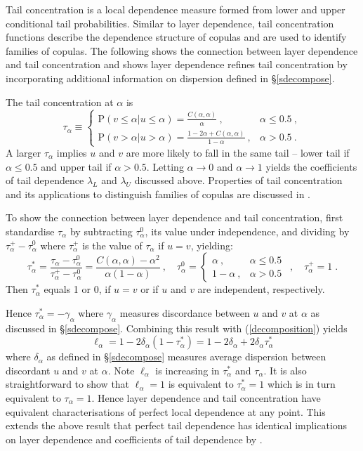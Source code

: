 \documentclass[authoryear]{elsarticle}
\newcommand{\p}{\mathrm{P}}
\newcommand{\cq}{\ ,\quad }
\newcommand{\eref}[1]{(\ref{#1})}
\newcommand{\sref}[1]{\S\ref{#1}}
\begin{document}
Tail concentration \citep{venter2002tails} is a local dependence measure formed from lower and upper conditional tail probabilities. Similar to layer dependence, tail concentration functions describe the dependence structure of copulas and are used to identify families of copulas. The following shows the connection between layer dependence and tail concentration and shows layer dependence refines tail concentration by incorporating additional information on dispersion defined in \sref{sdecompose}.

The tail concentration at $\alpha$ is
$$
\tau_\alpha  \equiv \left\{\begin{array}{lr}\p(v\leq \alpha|u\leq \alpha)=\frac{C(\alpha,\alpha)}{\alpha}\ ,  & \alpha\leq 0.5\ , \\
\p(v>\alpha|u>\alpha)=\frac{1-2\alpha+C(\alpha,\alpha)}{1-\alpha}\ ,& \alpha>0.5\ .\end{array}\right.
$$
A larger $\tau_\alpha$ implies $u$ and $v$ are more likely to fall in the same tail -- lower tail if $\alpha\leq 0.5$ and upper tail if $\alpha>0.5$. Letting $\alpha\rightarrow 0$ and $\alpha\rightarrow 1$  yields the coefficients of tail dependence $\lambda_L$ and $\lambda_U$ discussed above. Properties of tail concentration and its applications to distinguish families of copulas are  discussed in \cite{durante2014copulas}.


To show the connection between layer dependence and tail concentration, first standardise $\tau_\alpha$ by subtracting $\tau_\alpha^0$, its value under independence, and dividing by $\tau_\alpha^+-\tau_\alpha^0$ where $\tau_\alpha^+$ is the value of $\tau_\alpha$ if $u=v$, yielding:
$$
\tau_\alpha^*=\frac{\tau_\alpha-\tau_\alpha^0}{\tau_\alpha^+-\tau_\alpha^0} = \frac{C(\alpha,\alpha)-\alpha^2}{\alpha(1-\alpha)}
\cq
\tau_\alpha^0=\left\{\begin{array}{cc}\alpha \ , & \alpha\leq 0.5\ \\
1-\alpha \ ,& \alpha>0.5 \ \end{array}\right.
\cq
\tau_\alpha^+=1 \;.
$$
Then $\tau_\alpha^*$ equals 1 or 0, if $u=v$ or  if $u$ and $v$ are independent, respectively.

Hence $\tau_\alpha^*=-\gamma_\alpha$ where $\gamma_\alpha$ measures discordance between $u$ and $v$ at $\alpha$ as discussed in \sref{sdecompose}. Combining this result with \eref{decomposition} yields
$$
\ell_\alpha=1-2\delta_\alpha(1-\tau_\alpha^*) = 1-2\delta_\alpha + 2\delta_\alpha \tau_\alpha^*
$$
where $\delta_\alpha$ as defined in \sref{sdecompose} measures average dispersion between discordant $u$ and $v$ at $\alpha$.  Note $\ell_\alpha$ is increasing in $\tau_\alpha^*$ and $\tau_\alpha$. It is also straightforward to show that $\ell_\alpha=1$ is equivalent to $\tau_\alpha^*=1$ which is in turn equivalent to $\tau_\alpha=1$. Hence layer dependence and tail concentration have equivalent characterisations of perfect local dependence at any point. This extends the above result that perfect tail dependence has identical implications on layer dependence and coefficients of tail dependence by \cite{joe1997multivariate}.
\end{document}
